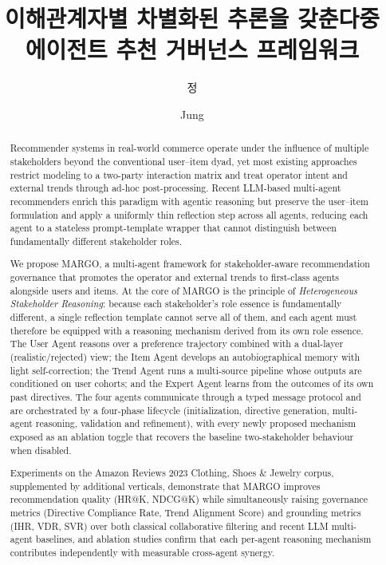 \documentclass[master,english,final]{postech-ucs}
\title[korean]{이해관계자별 차별화된 추론을 갖춘\linebreak 다중 에이전트 추천 거버넌스 프레임워크}
\title[english]{%
  {\centering
  MARGO:\\[0.35em]
  A Multi-Agent Framework for Stakeholder-Aware\\[0.35em]
  Recommendation Governance with Heterogeneous Reasoning\par}}
\author[korean]{정}{현 준}
\author[english]{Jung}{Hyunjun}
\begin{document}

\begin{abstract}

Recommender systems in real-world commerce operate under the influence of multiple stakeholders beyond the conventional user--item dyad, yet most existing approaches restrict modeling to a two-party interaction matrix and treat operator intent and external trends through ad-hoc post-processing.
Recent LLM-based multi-agent recommenders enrich this paradigm with agentic reasoning but preserve the user--item formulation and apply a uniformly thin reflection step across all agents, reducing each agent to a stateless prompt-template wrapper that cannot distinguish between fundamentally different stakeholder roles.

We propose MARGO, a multi-agent framework for stakeholder-aware recommendation governance that promotes the operator and external trends to first-class agents alongside users and items.
At the core of MARGO is the principle of \emph{Heterogeneous Stakeholder Reasoning}: because each stakeholder's role essence is fundamentally different, a single reflection template cannot serve all of them, and each agent must therefore be equipped with a reasoning mechanism derived from its own role essence.
The User Agent reasons over a preference trajectory combined with a dual-layer (realistic/rejected) view; the Item Agent develops an autobiographical memory with light self-correction; the Trend Agent runs a multi-source pipeline whose outputs are conditioned on user cohorts; and the Expert Agent learns from the outcomes of its own past directives.
The four agents communicate through a typed message protocol and are orchestrated by a four-phase lifecycle (initialization, directive generation, multi-agent reasoning, validation and refinement), with every newly proposed mechanism exposed as an ablation toggle that recovers the baseline two-stakeholder behaviour when disabled.

Experiments on the Amazon Reviews 2023 Clothing, Shoes \& Jewelry corpus, supplemented by additional verticals, demonstrate that MARGO improves recommendation quality (HR@K, NDCG@K) while simultaneously raising governance metrics (Directive Compliance Rate, Trend Alignment Score) and grounding metrics (IHR, VDR, SVR) over both classical collaborative filtering and recent LLM multi-agent baselines, and ablation studies confirm that each per-agent reasoning mechanism contributes independently with measurable cross-agent synergy.



    \end{abstract}
\end{document}
